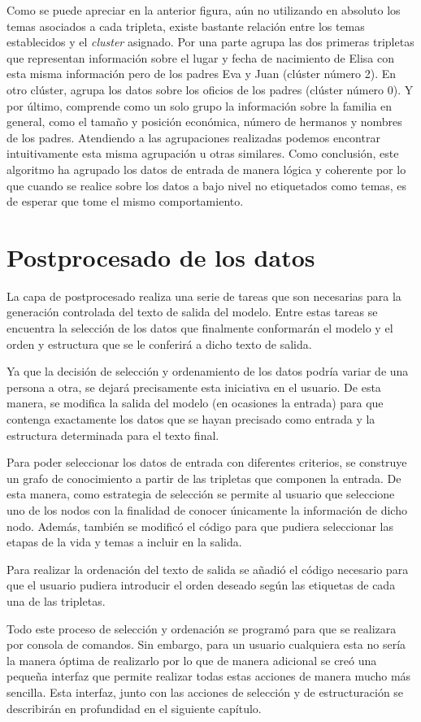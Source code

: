 Como se puede apreciar en la anterior figura, aún no utilizando en absoluto los temas asociados a cada tripleta, existe bastante relación entre los temas establecidos y el \textit{cluster} asignado. Por una parte agrupa las dos primeras tripletas que representan información sobre el lugar y fecha de nacimiento de Elisa con esta misma información pero de los padres Eva y Juan (clúster número 2). En otro clúster, agrupa los datos sobre los oficios de los padres (clúster número 0). Y por último, comprende como un solo grupo la información sobre la familia en general, como el tamaño y posición económica, número de hermanos y nombres de los padres. Atendiendo a las agrupaciones realizadas podemos encontrar intuitivamente esta misma agrupación u otras similares. Como conclusión, este algoritmo ha agrupado los datos de entrada de manera lógica y coherente por lo que cuando se realice sobre los datos a bajo nivel no etiquetados como temas, es de esperar que tome el mismo comportamiento.



\section{Postprocesado de los datos}

La capa de postprocesado realiza una serie de tareas que son necesarias para la generación controlada del texto de salida del modelo. Entre estas tareas se encuentra la selección de los datos que finalmente conformarán el modelo y el orden y estructura que se le conferirá a dicho texto de salida.

Ya que la decisión de selección y ordenamiento de los datos podría variar de una persona a otra, se dejará precisamente esta iniciativa en el usuario. De esta manera, se modifica la salida del modelo (en ocasiones la entrada) para que contenga exactamente los datos que se hayan precisado como entrada y la estructura determinada para el texto final.

Para poder seleccionar los datos de entrada con diferentes criterios, se construye un grafo de conocimiento a partir de las tripletas que componen la entrada. De esta manera, como estrategia de selección se permite al usuario que seleccione uno de los nodos con la finalidad de conocer únicamente la información de dicho nodo. Además, también se modificó el código para que pudiera seleccionar las etapas de la vida y temas a incluir en la salida.

Para realizar la ordenación del texto de salida se añadió el código necesario para que el usuario pudiera introducir el orden deseado según las etiquetas de cada una de las tripletas.

Todo este proceso de selección y ordenación se programó para que se realizara por consola de comandos. Sin embargo, para un usuario cualquiera esta no sería la manera óptima de realizarlo por lo que de manera adicional se creó una pequeña interfaz que permite realizar todas estas acciones de manera mucho más sencilla. Esta interfaz, junto con las acciones de selección y de estructuración se describirán en profundidad en el siguiente capítulo.



